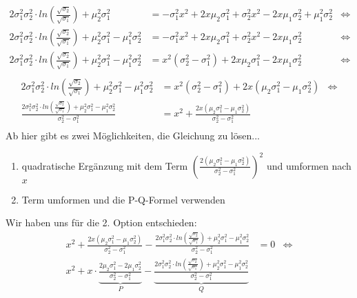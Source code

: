 \documentclass[12pt]{article}
\begin{document}
\begin{align*}
2 \sigma_1^2 \sigma_2^2 \cdot ln \left(\frac{\sqrt{\sigma_2}}{\sqrt{\sigma_1}}\right) + \mu_2^2\sigma_1^2 &= -\sigma_1^2x^2 +2x\mu_2\sigma_1^2 + \sigma_2^2 x^2 -2x\mu_1\sigma_2^2 + \mu_1^2\sigma_2^2 &\Leftrightarrow\\
2 \sigma_1^2 \sigma_2^2 \cdot ln \left(\frac{\sqrt{\sigma_2}}{\sqrt{\sigma_1}}\right) + \mu_2^2\sigma_1^2 - \mu_1^2\sigma_2^2&= -\sigma_1^2x^2 +2x\mu_2\sigma_1^2 + \sigma_2^2 x^2 -2x\mu_1\sigma_2^2 &\Leftrightarrow\\
2 \sigma_1^2 \sigma_2^2 \cdot ln \left(\frac{\sqrt{\sigma_2}}{\sqrt{\sigma_1}}\right) + \mu_2^2\sigma_1^2 - \mu_1^2\sigma_2^2&= x^2 (\sigma_2^2-\sigma_1^2) +2x\mu_2\sigma_1^2 -2x\mu_1\sigma_2^2 &\Leftrightarrow\\
\end{align*}
\newpage
\begin{align*}
2 \sigma_1^2 \sigma_2^2 \cdot ln \left(\frac{\sqrt{\sigma_2}}{\sqrt{\sigma_1}}\right) + \mu_2^2\sigma_1^2 - \mu_1^2\sigma_2^2&= x^2 (\sigma_2^2-\sigma_1^2) + 2x (\mu_2\sigma_1^2 - \mu_1\sigma_2^2) &\Leftrightarrow\\
\frac{2 \sigma_1^2 \sigma_2^2 \cdot ln \left(\frac{\sqrt{\sigma_2}}{\sqrt{\sigma_1}}\right) + \mu_2^2\sigma_1^2 - \mu_1^2\sigma_2^2}{\sigma_2^2-\sigma_1^2} &= x^2 + \frac{2x(\mu_2\sigma_1^2 - \mu_1\sigma_2^2)}{\sigma_2^2-\sigma_1^2}\\
\end{align*}
Ab hier gibt es zwei M\"oglichkeiten, die Gleichung zu l\"osen...
\begin{enumerate}
\item quadratische Erg\"anzung mit dem Term $\left(\frac{2(\mu_2\sigma_1^2 - \mu_1\sigma_2^2)}{\sigma_2^2-\sigma_1^2}\right)^2$ und umformen nach $x$
\item Term umformen und die P-Q-Formel verwenden
\end{enumerate}
Wir haben uns f\"ur die 2. Option entschieden:
\begin{align*}
x^2 + \frac{2x(\mu_2\sigma_1^2 - \mu_1\sigma_2^2)}{\sigma_2^2-\sigma_1^2} - \frac{2 \sigma_1^2 \sigma_2^2 \cdot ln \left(\frac{\sqrt{\sigma_2}}{\sqrt{\sigma_1}}\right) + \mu_2^2\sigma_1^2 - \mu_1^2\sigma_2^2}{\sigma_2^2-\sigma_1^2} &= 0 &\Leftrightarrow\\
x^2 + x \cdot \underbrace{\frac{2\mu_2\sigma_1^2 - 2\mu_1\sigma_2^2}{\sigma_2^2-\sigma_1^2}}_{P} - \underbrace{\frac{2 \sigma_1^2 \sigma_2^2 \cdot ln \left(\frac{\sqrt{\sigma_2}}{\sqrt{\sigma_1}}\right) + \mu_2^2\sigma_1^2 - \mu_1^2\sigma_2^2}{\sigma_2^2-\sigma_1^2}}_{Q}\\
\end{align*}
\end{document}
